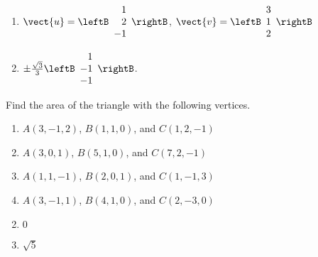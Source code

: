\begin{multicols}{2}
\begin{ex}
\begin{enumerate}[label={\alph*.}]
\item 
$\vect{u} = \leftB
\begin{array}{r}
1\\
2\\
-1
\end{array}
\rightB$, 
$\vect{v} = \leftB
\begin{array}{r}
3\\
1\\
2
\end{array}
\rightB$


\end{enumerate}
\begin{sol}
\begin{enumerate}[label={\alph*.}]
\setcounter{enumi}{1}
\item  $\pm \frac{\sqrt{3}}{3} \leftB
\begin{array}{r}
1\\
-1\\
-1
\end{array}
\rightB$.

\end{enumerate}
\end{sol}
\end{ex}

\begin{ex}
Find the area of the triangle with the following vertices.


\begin{enumerate}[label={\alph*.}]
\item $A(3, -1, 2)$, $B(1, 1, 0)$, and $C(1, 2, -1)$

\item $A(3, 0, 1)$, $B(5, 1, 0)$, and $C(7, 2, -1)$

\item $A(1, 1, -1)$, $B(2, 0, 1)$, and $C(1, -1, 3)$

\item $A(3, -1, 1)$, $B(4, 1, 0)$, and $C(2, -3, 0)$

\end{enumerate}
\begin{sol}
\begin{enumerate}[label={\alph*.}]
\setcounter{enumi}{1}
\item $0$

\setcounter{enumi}{3}
\item $\sqrt{5}$

\end{enumerate}
\end{sol}
\end{ex}


\end{multicols}
